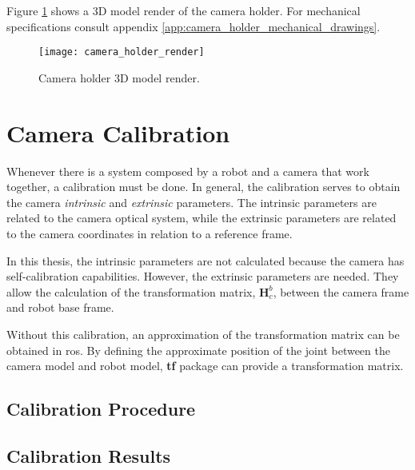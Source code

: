 Figure \ref{fig:camera_holder_render} shows a 3D model render of the camera holder. For mechanical specifications consult appendix \ref{app:camera_holder_mechanical_drawings}.

\begin{figure}[htbp]
	\centering
	\texttt{[image: camera\_holder\_render]}
	\caption{Camera holder 3D model render.}
	\label{fig:camera_holder_render}
\end{figure}



\section{Camera Calibration}
\label{sec:vision_system_camera_calibration}

Whenever there is a system composed by a robot and a camera that work together, a calibration must be done. In general, the calibration serves to obtain the camera \textit{intrinsic} and \textit{extrinsic} parameters. The intrinsic parameters are related to the camera optical system, while the extrinsic parameters are related to the camera coordinates in relation to a reference frame.

In this thesis, the intrinsic parameters are not calculated because the camera has self-calibration capabilities. However, the extrinsic parameters are needed. They allow the calculation of the transformation matrix, $\boldsymbol{H}^b_c$, between the camera frame and robot base frame.

Without this calibration, an approximation of the transformation matrix can be obtained in \gls{ros}. By defining the approximate position of the joint between the camera model and robot model, \textbf{tf} package can provide a transformation matrix.

\subsection{Calibration Procedure}
\label{subsec:vision_system_camera_calibration_procedure}


\subsection{Calibration Results}
\label{subsec:vision_system_camera_calibration_results}

